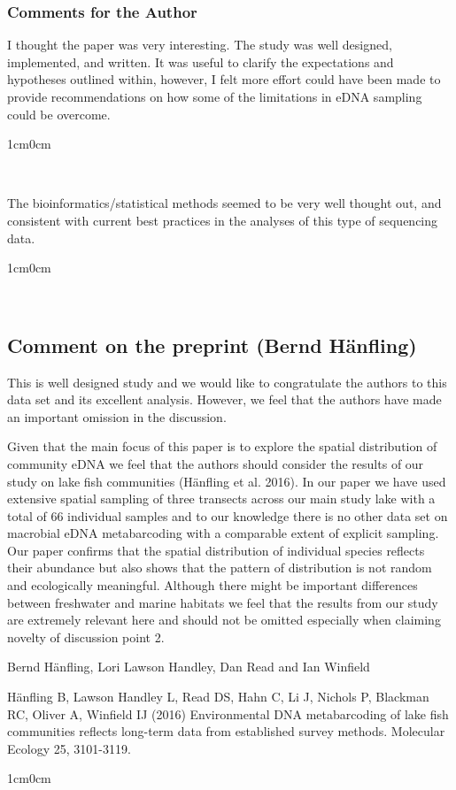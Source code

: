 \documentclass{article}
\newenvironment{response}
	{
	\begin{adjustwidth}{1cm}{0cm}
	\itshape %
	}
	{
	\end{adjustwidth}
	}
\begin{document}
\subsubsection{Comments for the Author}
I thought the paper was very interesting. The study was well designed, implemented, and written. It was useful to clarify the expectations and hypotheses outlined within, however, I felt more effort could have been made to provide recommendations on how some of the limitations in eDNA sampling could be overcome.
\begin{response}
  \\
\end{response}

The bioinformatics/statistical methods seemed to be very well thought out, and consistent with current best practices in the analyses of this type of sequencing data.
\begin{response}
  \\
\end{response}


\subsection*{Comment on the preprint (Bernd Hänfling)}
This is well designed study and we would like to congratulate the authors to this data set and its excellent analysis. However, we feel that the authors have made an important omission in the discussion.

Given that the main focus of this paper is to explore the spatial distribution of community eDNA we feel that the authors should consider the results of our study on lake fish communities (Hänfling et al. 2016). In our paper we have used extensive spatial sampling of three transects across our main study lake with a total of 66 individual samples and to our knowledge there is no other data set on macrobial eDNA metabarcoding with a comparable extent of explicit sampling. Our paper confirms that the spatial distribution of individual species reflects their abundance but also shows that the pattern of distribution is not random and ecologically meaningful. Although there might be important differences between freshwater and marine habitats we feel that the results from our study are extremely relevant here and should not be omitted especially when claiming novelty of discussion point 2.

Bernd Hänfling, Lori Lawson Handley, Dan Read and Ian Winfield

Hänfling B, Lawson Handley L, Read DS, Hahn C, Li J, Nichols P, Blackman RC, Oliver A, Winfield IJ (2016) Environmental DNA metabarcoding of lake fish communities reflects long-term data from established survey methods. Molecular Ecology 25, 3101-3119.
\begin{response}
  \\
\end{response}
\end{document}
